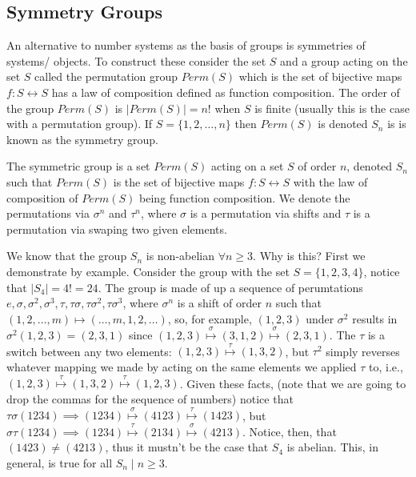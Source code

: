 \documentclass[12pt,oneside]{report}
\begin{document}
\subsection{Symmetry Groups}

An alternative to number systems as the basis of groups is symmetries of systems/ objects. To construct these consider the set \( S \) and a group acting on the set \( S \) called the permutation group \( Perm(S) \) which is the set of bijective maps \( f: S \leftrightarrow S \) has a law of composition defined as function composition. The order of the group \( Perm(S) \) is \( |Perm(S)| =n! \) when \( S \) is finite (usually this is the case with a permutation group). If \( S = \{ 1,2,\ldots ,n \} \) then \( Perm(S) \) is denoted \( S_n \) is is known as the symmetry group.

\begin{definition}
  The symmetric group is a set \( Perm(S) \) acting on a set \( S \) of order \( n \), denoted \( S_n \) such that \( Perm(S) \) is the set of bijective maps \( f: S \leftrightarrow S \) with the law of composition of \( Perm(S) \) being function composition. We denote the permutations via \( \sigma^n  \) and \( \tau ^n \), where \( \sigma  \) is a permutation via shifts and \( \tau  \) is a permutation via swaping two given elements. 
\end{definition}


\begin{problem}[1.1.1]
  We know that the group \( S_n \) is non-abelian \( \forall n\ge 3 \). Why is this? First we demonstrate by example. Consider the group with the set \( S =\{1,2,3,4\}\), notice that \( |S_4| =4! =24 \). The group is made of up a sequence of perumtations \( e,\sigma ,\sigma^2,\sigma^3,\tau ,\tau \sigma ,\tau \sigma^2,\tau \sigma^3 \), where \( \sigma ^n \) is a shift of order \( n \) such that \( (1,2,\ldots,m )\mapsto (\ldots ,m,1,2,\ldots ) \), so, for example, \( (1,2,3)\) under \( \sigma^2 \) results in \(\sigma^2(1,2,3)=(2,3,1)\) since \( (1,2,3)\overset{\sigma}{\mapsto} (3,1,2) \overset{\sigma}{\mapsto} (2,3,1) \). The \( \tau  \) is a switch between any two elements: \( (1,2,3)\overset{\tau}{\mapsto}(1,3,2) \), but \( \tau ^2 \) simply reverses whatever mapping we made by acting on the same elements we applied \( \tau  \) to, i.e., \( (1,2,3)\overset{\tau}{\mapsto}(1,3,2)\overset{\tau }{\mapsto}(1,2,3) \). Given these facts, (note that we are going to drop the commas for the sequence of numbers) notice that \( \tau \sigma (1234) \implies (1234)\overset{\sigma}{\mapsto} (4123) \overset{\tau }{\mapsto} (1423)\), but \( \sigma \tau (1234)\implies (1234)\overset{\tau }{\mapsto} (2134) \overset{\sigma  }{\mapsto} (4213) \). Notice, then, that \( (1423)\neq (4213) \), thus it mustn't be the case that \( S_4 \) is abelian. This, in general, is true for all \( S_n \mid n\ge 3 \). 
\end{problem}
\end{document}
